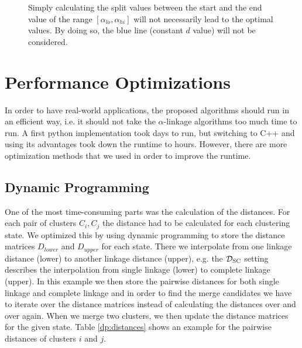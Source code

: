\begin{figure}
    \centering
    \caption{Simply calculating the split values between the start and the end value of the range $[\alpha_{lo}, \alpha_{hi}]$ will not necessarily lead to the optimal values. By doing so, the blue line (constant $d$ value) will not be considered.}
    \label{fig:optimal}
\end{figure}

\section{Performance Optimizations}

In order to have real-world applications, the proposed algorithms should run in an efficient way, i.e. it should not take the $\alpha$-linkage algorithms too much time to run. A first python implementation took days to run, but switching to C++ and using its advantages took down the runtime to hours. However, there are more optimization methods that we used in order to improve the runtime.

\subsection{Dynamic Programming}

One of the most time-consuming parts was the calculation of the distances. For each pair of clusters $C_i, C_j$ the distance had to be calculated for each clustering state. We optimized this by using dynamic programming to store the distance matrices $D_{lower}$ and $D_{upper}$ for each state. There we interpolate from one linkage distance (lower) to another linkage distance (upper), e.g. the $\mathcal{D}_\text{SC}$ setting describes the interpolation from single linkage (lower) to complete linkage (upper). In this example we then store the pairwise distances for both single linkage and complete linkage and in order to find the merge candidates we have to iterate over the distance matrices instead of calculating the distances over and over again. When we merge two clusters, we then update the distance matrices for the given state. Table \ref{dp:distances} shows an example for the pairwise distances of clusters $i$ and $j$.


